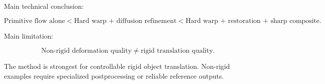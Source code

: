 \documentclass[11pt,a4paper]{article}
\begin{document}
Main technical conclusion:

\begin{equation}
\text{Primitive flow alone}
<
\text{Hard warp + diffusion refinement}
<
\text{Hard warp + restoration + sharp composite}.
\end{equation}

Main limitation:

\begin{equation}
\text{Non-rigid deformation quality}
\neq
\text{rigid translation quality}.
\end{equation}

The method is strongest for controllable rigid object translation. Non-rigid examples require specialized postprocessing or reliable reference outputs.
\end{document}
